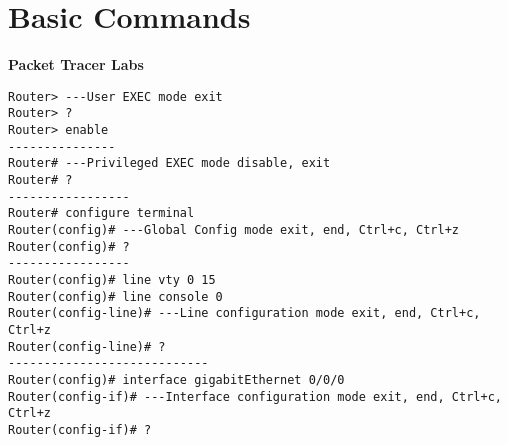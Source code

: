 \documentclass[../EngineeringJournal_CDavis.tex]{subfiles}
\begin{document}

\chapter*{Basic \linebreak[1] Commands \hspace*{\fill}{2020}}
\noindent\textbf{{Packet Tracer Labs} }                             


\hspace{0.2cm}
\begin{tcolorbox}[width=6.3in]
\scriptsize 
\begin{verbatim}
Router> ---User EXEC mode exit
Router> ?
Router> enable
---------------
Router# ---Privileged EXEC mode disable, exit
Router# ?
-----------------
Router# configure terminal
Router(config)# ---Global Config mode exit, end, Ctrl+c, Ctrl+z
Router(config)# ?
-----------------
Router(config)# line vty 0 15
Router(config)# line console 0
Router(config-line)# ---Line configuration mode exit, end, Ctrl+c, Ctrl+z
Router(config-line)# ?
----------------------------
Router(config)# interface gigabitEthernet 0/0/0
Router(config-if)# ---Interface configuration mode exit, end, Ctrl+c, Ctrl+z
Router(config-if)# ?
\end{verbatim}
\end{tcolorbox}
\hspace{0.2cm}
\normalsize  

\newpage

\end{document}
